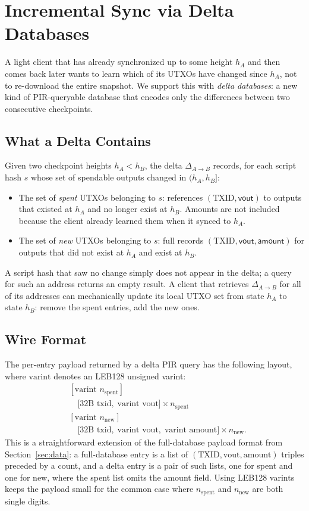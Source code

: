 \section{Incremental Sync via Delta Databases}
\label{sec:delta-db}

A light client that has already synchronized up to some height $h_A$ and then comes back later wants to learn which of its UTXOs have changed since $h_A$, not to re-download the entire snapshot. We support this with \emph{delta databases}: a new kind of PIR-queryable database that encodes only the differences between two consecutive checkpoints.

\subsection{What a Delta Contains}

Given two checkpoint heights $h_A < h_B$, the delta $\Delta_{A \to B}$ records, for each script hash $s$ whose set of spendable outputs changed in $(h_A, h_B]$:
\begin{itemize}[nolistsep,leftmargin=*]
    \item The set of \emph{spent} UTXOs belonging to $s$: references $(\text{TXID}, \mathsf{vout})$ to outputs that existed at $h_A$ and no longer exist at $h_B$. Amounts are not included because the client already learned them when it synced to $h_A$.
    \item The set of \emph{new} UTXOs belonging to $s$: full records $(\text{TXID}, \mathsf{vout}, \mathsf{amount})$ for outputs that did not exist at $h_A$ and exist at $h_B$.
\end{itemize}
A script hash that saw no change simply does not appear in the delta; a query for such an address returns an empty result. A client that retrieves $\Delta_{A \to B}$ for all of its addresses can mechanically update its local UTXO set from state $h_A$ to state $h_B$: remove the spent entries, add the new ones.

\subsection{Wire Format}

The per-entry payload returned by a delta PIR query has the following layout, where $\text{varint}$ denotes an LEB128 unsigned varint:
\begin{align*}
&[\text{varint } n_\text{spent}]\\
&\quad\bigl[\text{32B txid},\; \text{varint vout}\bigr] \times n_\text{spent} \\
&[\text{varint } n_\text{new}]\\
&\quad\bigl[\text{32B txid},\; \text{varint vout},\; \text{varint amount}\bigr] \times n_\text{new}.
\end{align*}
This is a straightforward extension of the full-database payload format from Section~\ref{sec:data}: a full-database entry is a list of $(\text{TXID}, \text{vout}, \text{amount})$ triples preceded by a count, and a delta entry is a pair of such lists, one for spent and one for new, where the spent list omits the amount field. Using LEB128 varints keeps the payload small for the common case where $n_\text{spent}$ and $n_\text{new}$ are both single digits.

